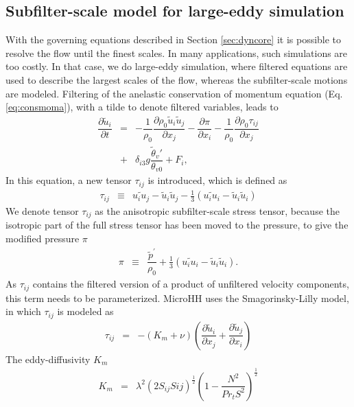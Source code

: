 \documentclass[gmd]{copernicus}
\newcommand{\uf}{\ensuremath{\widetilde{u}}}
\newcommand{\thetaf}{\ensuremath{\widetilde{\theta}}}
\begin{document}
\subsection{Subfilter-scale model for large-eddy simulation}
With the governing equations described in Section \ref{sec:dyncore} it is possible to resolve the flow until the finest scales. In many applications, such simulations are too costly. In that case, we do large-eddy simulation, where filtered equations are used to describe the largest scales of the flow, whereas the subfilter-scale motions are modeled. Filtering of the anelastic conservation of momentum equation (Eq. \ref{eq:consmoma}), with a tilde to denote filtered variables, leads to 
\begin{eqnarray}
\nonumber \dfrac{\partial \uf_i}{\partial t} & = & - \dfrac{1}{\rho_0} \dfrac{\partial \rho_0 \uf_i \uf_j}{\partial x_j} 
- \dfrac{\partial \pi}{\partial x_i} - \dfrac{1}{\rho_0} \dfrac{\partial \rho_0 \tau_{ij}}{\partial x_j}\\
& + & \delta_{i3} g \dfrac{\thetaf_v'}{\theta_{v0}} + F_i,\label{eq:consmoma_filter}
\end{eqnarray}
In this equation, a new tensor $\tau_{ij}$ is introduced, which is defined as
\begin{eqnarray}
\tau_{ij}  & \equiv & \widetilde{u_i u_j} - \uf_i \uf_j - \frac{1}{3} \left( \widetilde{u_i u_i} - \uf_i \uf_i \right)
\end{eqnarray}
We denote tensor $\tau_{ij}$ as the anisotropic subfilter-scale stress tensor, because the isotropic part of the full stress tensor has been moved to the pressure, to give the modified pressure $\pi$
\begin{eqnarray}
\pi        & \equiv & \dfrac{\widetilde{p}^\prime}{\rho_0} + \frac{1}{3} \left( \widetilde{u_i u_i} - \uf_i \uf_i \right).
\end{eqnarray}
As $\tau_{ij}$ contains the filtered version of a product of unfiltered velocity components, this term needs to be parameterized. MicroHH uses the Smagorinsky-Lilly \citep{Lilly1968} model, in which $\tau_{ij}$ is modeled as
\begin{eqnarray}
\tau_{ij} & = & -\left( K_m + \nu \right) \left( \dfrac{\partial \uf_i}{\partial x_j} + \dfrac{\partial \uf_j}{\partial x_i} \right)
\end{eqnarray}
The eddy-diffusivity $K_m$ 
\begin{eqnarray}
K_m    & = & \lambda^2 \left( 2 S_{ij} S{ij} \right)^\frac{1}{2}
\left(1 - \dfrac{N^2}{Pr_t S^2} \right)^\frac{1}{2}
\end{eqnarray}
\end{document}
